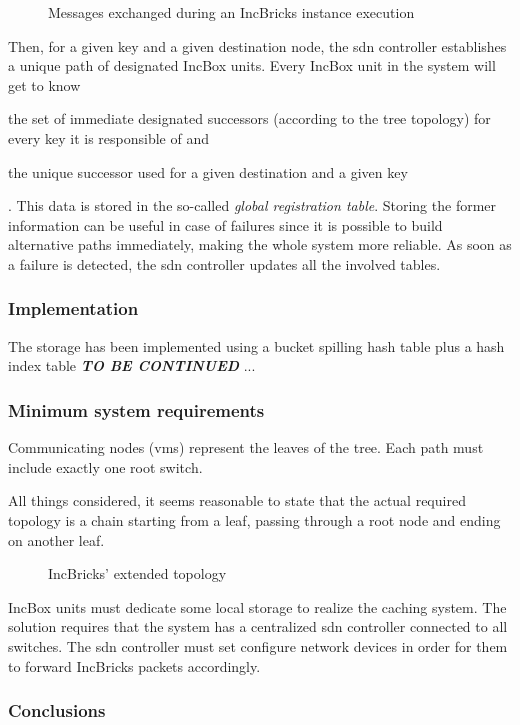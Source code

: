 \begin{figure}[!htb]
    \centering
    \usebox{\incbrickssd}
    \caption{Messages exchanged during an IncBricks \texorpdfstring{\cite{incbricks}}{} instance execution}
\end{figure}

Then, for a given key and a given destination node, the \gls{sdn} controller establishes a unique path of designated IncBox units.
Every IncBox unit in the system will get to know
\begin{mylist}
    \item the set of immediate designated successors (according to the tree topology) for every key it is responsible of and
    \item the unique successor used for a given destination and a given key
\end{mylist}.
This data is stored in the so-called \textit{global registration table}.
Storing the former information can be useful in case of failures since it is possible to build alternative paths immediately, making the whole system more reliable.
As soon as a failure is detected, the \gls{sdn} controller updates all the involved tables.

\subsubsection{Implementation}
The storage has been implemented using a bucket spilling hash table plus a hash index table
\textbf{\textit{TO BE CONTINUED}} ... %

\subsubsection{Minimum system requirements}
Communicating nodes (\glspl{vm}) represent the leaves of the tree.
Each path must include exactly one root switch.



All things considered, it seems reasonable to state that the actual required topology is a chain starting from a leaf, passing through a root node and ending on another leaf.

\begin{figure}[!htb]
    \centering
    \usebox{\incbricksextended}
    \caption{IncBricks' \texorpdfstring{\cite{incbricks}}{} extended topology}
\end{figure}

IncBox units must dedicate some local storage to realize the caching system.
The solution requires that the system has a centralized \gls{sdn} controller connected to all switches.
The \gls{sdn} controller must set configure network devices in order for them to forward IncBricks \cite{incbricks} packets accordingly.

\subsubsection{Conclusions}
